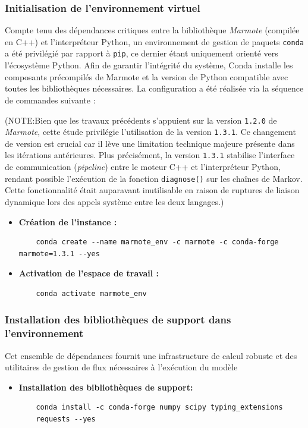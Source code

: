 \documentclass[14pt, a4paper]{extarticle}
\begin{document}
\subsubsection{Initialisation de l'environnement virtuel}
Compte tenu des dépendances critiques entre la bibliothèque \textit{Marmote} (compilée en C++) et l'interpréteur Python, un environnement de gestion de paquets \texttt{conda} a été privilégié par rapport à \texttt{pip}, ce dernier étant uniquement orienté vers l'écosystème Python. Afin de garantir l'intégrité du système, Conda installe les composants précompilés de Marmote et la version de Python compatible avec toutes les bibliothèques nécessaires. La configuration a été réalisée via la séquence de commandes suivante :

(NOTE:Bien que les travaux précédents s'appuient sur la version \texttt{1.2.0} de \textit{Marmote}, cette étude privilégie l'utilisation de la version \texttt{1.3.1}. 
Ce changement de version est crucial car il lève une limitation technique majeure présente dans les itérations antérieures. Plus précisément, la version \texttt{1.3.1} stabilise l'interface de communication (\textit{pipeline}) entre le moteur C++ et l'interpréteur Python, rendant possible l'exécution de la fonction \texttt{diagnose()} sur les chaînes de Markov. Cette fonctionnalité était auparavant inutilisable en raison de ruptures de liaison dynamique lors des appels système entre les deux langages.)

\begin{itemize}
    \item \textbf{Création de l'instance :} 
    \begin{verbatim}
    conda create --name marmote_env -c marmote -c conda-forge 
marmote=1.3.1 --yes
    \end{verbatim}
    \item \textbf{Activation de l'espace de travail :} 
    \begin{verbatim}
    conda activate marmote_env
    \end{verbatim}
\end{itemize}

\subsubsection{Installation des bibliothèques de support dans l'environnement}
Cet ensemble de dépendances fournit une infrastructure de calcul robuste et des utilitaires de gestion de flux nécessaires à l'exécution du modèle
\begin{itemize}
\item \textbf{Installation des bibliothèques de support:} 
    \begin{verbatim}
    conda install -c conda-forge numpy scipy typing_extensions 
    requests --yes
    \end{verbatim}
\end{itemize}
\end{document}
